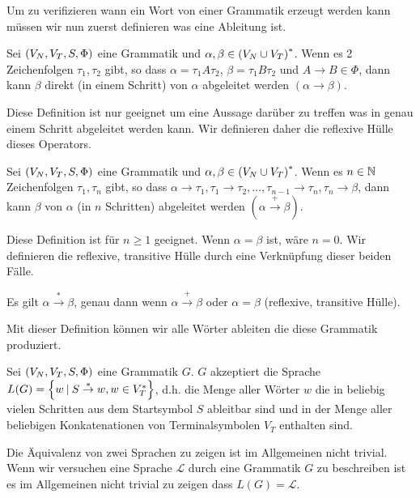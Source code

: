 Um zu verifizieren wann ein Wort von einer Grammatik erzeugt werden kann müssen wir nun zuerst definieren was eine Ableitung ist.

\begin{defn}
Sei $\left(V_N,V_T,S,\Phi\right)$ eine Grammatik und $\alpha,\beta \in \left(V_N \cup V_T\right)^*$.
Wenn es 2 Zeichenfolgen $\tau_1,\tau_2$ gibt, so dass $\alpha=\tau_1 A \tau_2$, $\beta=\tau_1 B \tau_2$ und $A \to B \in \Phi$,
dann kann $\beta$ direkt (in einem Schritt) von $\alpha$ abgeleitet werden $(\alpha \to \beta)$.
\end{defn}

Diese Definition ist nur geeignet um eine Aussage darüber zu treffen was in genau einem Schritt abgeleitet werden kann. Wir definieren daher die reflexive Hülle dieses Operators.

\begin{defn}
Sei $\left(V_N,V_T,S,\Phi\right)$ eine Grammatik und $\alpha,\beta \in \left(V_N \cup V_T\right)^*$.
Wenn es $n \in \mathbb{N}$ Zeichenfolgen $\tau_1,\tau_n$ gibt, so dass $\alpha \to \tau_1, \tau_1 \to \tau_2 , \ldots , \tau_{n-1} \to \tau_n , \tau_n \to \beta$,
dann kann $\beta$ von $\alpha$ (in $n$ Schritten) abgeleitet werden $(\alpha \overset{+}{\to} \beta)$.
\end{defn}

Diese Definition ist für $n \geq 1$ geeignet. Wenn $\alpha = \beta$ ist, wäre $n=0$. Wir definieren die reflexive, transitive Hülle durch eine Verknüpfung dieser beiden Fälle.

\begin{defn}
Es gilt $\alpha \overset{*}{\to} \beta$, genau dann wenn $\alpha \overset{+}{\to} \beta$ oder $\alpha = \beta$ (reflexive, transitive Hülle).
\end{defn}

Mit dieser Definition können wir alle Wörter ableiten die diese Grammatik produziert.

\begin{defn}
Sei $\left(V_N,V_T,S,\Phi\right)$ eine Grammatik $G$. $G$ akzeptiert die Sprache $L(G)=\left\{w \: | \: S \overset{*}{\to} w, w \in V_T^*\right\}$, d.h. die Menge aller Wörter $w$ die in beliebig
vielen Schritten aus dem Startsymbol $S$ ableitbar sind und in der Menge aller beliebigen Konkatenationen von Terminalsymbolen $V_T$ enthalten sind.
\end{defn}

Die Äquivalenz von zwei Sprachen zu zeigen ist im Allgemeinen nicht trivial. Wenn wir versuchen eine Sprache $\mathcal{L}$ durch eine Grammatik $G$ zu beschreiben
ist es im Allgemeinen nicht trivial zu zeigen dass $L(G)=\mathcal{L}$.

